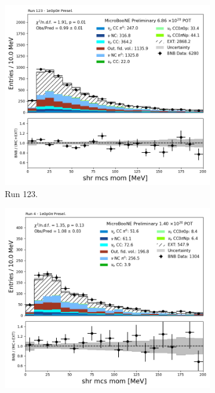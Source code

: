 \begin{figure}[H]
    \centering
    \begin{subfigure}[t]{0.32\linewidth}
        \includegraphics[width=\linewidth]{technote/Appendix_Preselection/Figures/1e0p0pi/Run123/shrMCSMom_Run123_1e0p0pi_Presel.png}
        \caption{Run 123.}
    \end{subfigure}%
    \hspace{0.2cm}%
    \begin{subfigure}[t]{0.32\linewidth}
        \includegraphics[width=\linewidth]{technote/Appendix_Preselection/Figures/1e0p0pi/Run4b/shrMCSMom_Run4b_1e0p0pi_Presel.png}

\end{subfigure}
\end{figure}
